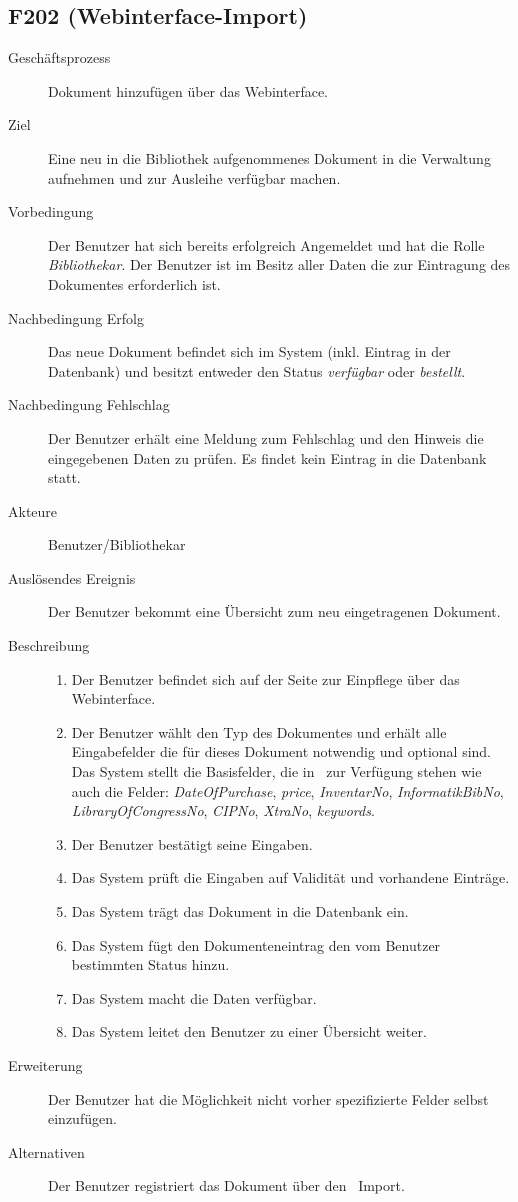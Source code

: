 \subsection{F202 (Webinterface-Import)}
\label{F:Web-Import}
\begin{description}
  \item[Geschäftsprozess]Dokument hinzufügen über das Webinterface.
  \item[Ziel]Eine neu in die Bibliothek aufgenommenes Dokument in die Verwaltung aufnehmen und zur Ausleihe verfügbar machen.
  \item[Vorbedingung]Der Benutzer hat sich bereits erfolgreich Angemeldet und hat die Rolle \emph{Bibliothekar}. Der Benutzer ist im Besitz aller Daten die zur Eintragung des Dokumentes erforderlich ist.
  \item[Nachbedingung Erfolg]Das neue Dokument befindet sich im System (inkl. Eintrag in der Datenbank) und besitzt entweder den Status \emph{verfügbar} oder \emph{bestellt}.
  \item[Nachbedingung Fehlschlag]Der Benutzer erhält eine Meldung zum Fehlschlag und den Hinweis die eingegebenen Daten zu prüfen. Es findet kein Eintrag in die Datenbank statt.
  \item[Akteure]Benutzer/Bibliothekar
  \item[Auslösendes Ereignis]Der Benutzer bekommt eine Übersicht zum neu eingetragenen Dokument.
  \item[Beschreibung]\hfill
    \begin{enumerate}
      \item Der Benutzer befindet sich auf der Seite zur Einpflege über das Webinterface.
      \item Der Benutzer wählt den Typ des Dokumentes und erhält alle Eingabefelder die für dieses Dokument notwendig und optional sind. Das System stellt die Basisfelder, die in \BibTeX\ zur Verfügung stehen wie auch die Felder: \emph{DateOfPurchase}, \emph{price}, \emph{InventarNo}, \emph{InformatikBibNo}, \emph{LibraryOfCongressNo}, \emph{CIPNo}, \emph{XtraNo}, \emph{keywords}.
      \item Der Benutzer bestätigt seine Eingaben.
      \item Das System prüft die Eingaben auf Validität und vorhandene Einträge.
      \item Das System trägt das Dokument in die Datenbank ein.
      \item Das System fügt den Dokumenteneintrag den vom Benutzer bestimmten Status hinzu.
      \item Das System macht die Daten verfügbar.
      \item Das System leitet den Benutzer zu einer Übersicht weiter.
    \end{enumerate}
  \item[Erweiterung]Der Benutzer hat die Möglichkeit nicht vorher spezifizierte Felder selbst einzufügen.
  \item[Alternativen]Der Benutzer registriert das Dokument über den \BibTeX\ Import.
\end{description}

